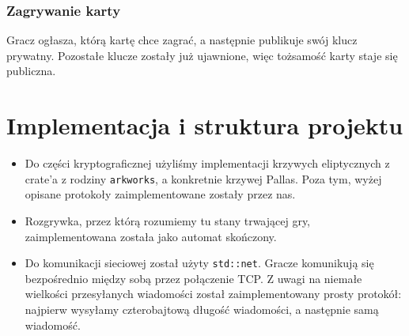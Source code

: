 \documentclass{article}
\begin{document}
\subsubsection{Zagrywanie karty}

Gracz ogłasza, którą kartę chce zagrać, a następnie publikuje swój klucz prywatny. Pozostałe klucze zostały już ujawnione, więc tożsamość karty staje się publiczna.

\section{Implementacja i struktura projektu}


\begin{itemize}
    \item Do części kryptograficznej użyliśmy implementacji krzywych eliptycznych z crate'a z rodziny \texttt{arkworks}, a konkretnie krzywej Pallas. Poza tym, wyżej opisane protokoły zaimplementowane zostały przez nas.
    \item Rozgrywka, przez którą rozumiemy tu stany trwającej gry, zaimplementowana została jako automat skończony.
    \item Do komunikacji sieciowej został użyty \texttt{std::net}. Gracze komunikują się bezpośrednio między sobą przez połączenie TCP. Z uwagi na niemałe wielkości przesyłanych wiadomości został zaimplementowany prosty protokół: najpierw wysyłamy czterobajtową długość wiadomości, a następnie samą wiadomość.
\end{itemize}
\end{document}
